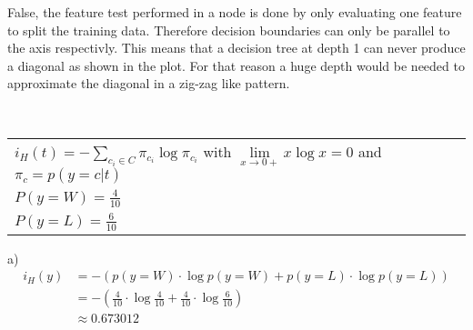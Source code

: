 %
%
%
\begin{flushleft}
False, the feature test performed in a node is done by only evaluating one feature to split the training data. Therefore decision boundaries can only be parallel to the axis respectivly. This means that a decision tree at depth 1 can never produce a diagonal as shown in the plot. For that reason a huge depth would be needed to approximate the diagonal in a zig-zag like pattern.
\end{flushleft}
%
%
%
\\
\begin{table}[!h]
\begin{tabular}{ll}
  $i_H(t) = - \sum_{c_i \in C} \pi_{c_i} \log \pi_{c_i}$ with $\underset{x\rightarrow 0+}{\lim} x\log x = 0$ and $\pi_c = p(y=c|t)$ \\
  $P(y=W) = \frac{4}{10}$ \\
  $P(y=L) = \frac{6}{10}$
\end{tabular}
\end{table}
\begin{flushleft}
  a) 
  \begin{align*}
    i_H(y) &= - (p(y=W) \cdot \log p(y=W) + p(y=L) \cdot \log p(y=L)) \\
    &= -(\frac{4}{10} \cdot \log \frac{4}{10} + \frac{4}{10} \cdot \log \frac{6}{10}) \\
    &\approx 0.673012
  \end{align*}
\end{flushleft}
